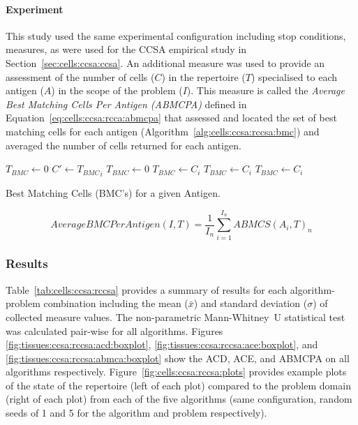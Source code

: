 %
%
\paragraph{Experiment}
This study used the same experimental configuration including stop conditions, measures, as were used for the CCSA empirical study in Section~\ref{sec:cells:ccsa:ccsa}. 
An additional measure was used to provide an assessment of the number of cells ($C$) in the repertoire ($T$) specialised to each antigen ($A$) in the scope of the problem ($I$). This measure is called the \emph{Average Best Matching Cells Per Antigen (ABMCPA)} defined in Equation~\ref{eq:cells:ccsa:rcca:abmcpa} that assessed and located the set of best matching cells for each antigen (Algorithm~\ref{alg:cells:ccsa:rccsa:bmc}) and averaged the number of cells returned for each antigen.

\begin{algorithm}[htp]
  \SetLine
  
  
  \KwIn{\Tissue, \Antigen}		
  
	$T_{BMC} \leftarrow$0\;
	{
		\;
		{
			$C\prime \leftarrow {T_{BMC}}_i$\;
			{
				$T_{BMC} \leftarrow$0\;
				$T_{BMC} \leftarrow C_i$\;
			}
			{
				$T_{BMC} \leftarrow C_i$\;
			}
		}
		\Else
		{
			$T_{BMC} \leftarrow C_i$\;
		}		
	}
	\;
	
	\caption{Best Matching Cells (BMC's) for a given Antigen.}
	\label{alg:cells:ccsa:rccsa:bmc}	
\end{algorithm}



\begin{equation}
	AverageBMCPerAntigen(I,T) = \frac{1}{I_n} \sum_{i=1}^{I_n} {ABMCS(A_i, T)}_n
	\label{eq:cells:ccsa:rcca:abmcpa}
\end{equation}


%
%
\subsubsection{Results}
Table~\ref{tab:cells:ccsa:rccsa} provides a summary of results for each algorithm-problem combination including the mean ($\bar{x}$) and standard deviation ($\sigma$) of collected measure values. The non-parametric Mann-Whitney~U statistical test was calculated pair-wise for all algorithms. 
Figures \ref{fig:tissues:ccsa:rccsa:acd:boxplot}, \ref{fig:tissues:ccsa:rccsa:ace:boxplot}, and \ref{fig:tissues:ccsa:rccsa:abmca:boxplot} show the ACD, ACE, and ABMCPA on all algorithms respectively. 
Figure~\ref{fig:cells:ccsa:rccsa:plots} provides example plots of the state of the repertoire (left of each plot) compared to the problem domain (right of each plot) from each of the five algorithms (same configuration, random seeds of 1 and 5 for the algorithm and problem respectively). 

